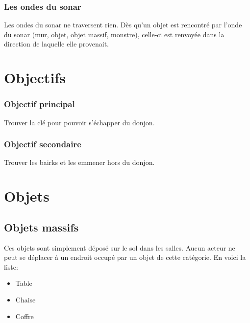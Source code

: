 \documentclass[a4paper, 11pt]{report}
\begin{document}
        \subsection{Les ondes du sonar}
          Les ondes du sonar ne traversent rien. Dès qu'un objet est rencontré par l'onde du sonar (mur, objet,
          objet massif, monstre), celle-ci est renvoyée dans la direction de laquelle elle provenait.
          

    \chapter{Objectifs}
      \subsection{Objectif principal}
        Trouver la clé pour pouvoir s'échapper du donjon.
        
      \subsection{Objectif secondaire}
        Trouver les bairks et les emmener hors du donjon.
      
    \chapter{Objets}
      \section{Objets massifs}
        Ces objets sont simplement déposé sur le sol dans les salles. Aucun acteur ne peut se déplacer
        à un endroit occupé par un objet de cette catégorie. En voici la liste:
        \begin{itemize}
        \item{Table}
        \item{Chaise}
        \item{Coffre}
        \end{itemize}
        
\end{document}

